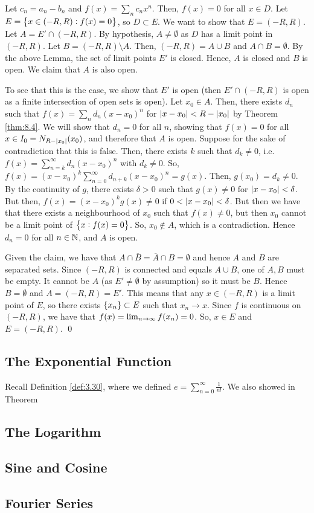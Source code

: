 \begin{nproof}
    Let $c_n = a_n - b_n$ and $f(x) = \sum_n c_nx^n$. Then, $f(x) = 0$ for all $x \in D$. Let $E = \set{x \in (-R, R): f(x) = 0}$, so $D \subset E$. We want to show that $E = (-R, R)$. Let $A = E' \cap (-R, R)$. By hypothesis, $A \neq \emptyset$ as $D$ has a limit point in $(-R, R)$. Let $B = (-R, R) \setminus A$. Then, $(-R, R) = A \cup B$ and $A \cap B = \emptyset$. By the above Lemma, the set of limit points $E'$ is closed. Hence, $A$ is closed and $B$ is open. We claim that $A$ is also open.

    To see that this is the case, we show that $E'$ is open (then $E' \cap (-R, R)$ is open as a finite intersection of open sets is open). Let $x_0 \in A$. Then, there exists $d_n$ such that $f(x) = \sum_n d_n(x - x_0)^n$ for $\abs{x - x_0} < R - \abs{x_0}$ by Theorem \ref{thm:8.4}. We will show that $d_n = 0$ for all $n$, showing that $f(x) = 0$ for all $x \in I_0 = N_{R - \abs{x_0}}(x_0)$, and therefore that $A$ is open. Suppose for the sake of contradiction that this is false. Then, there exists $k$ such that $d_k \neq 0$, i.e. $f(x) = \sum_{n=k}^\infty d_n(x - x_0)^n$ with $d_k \neq 0$. So, $f(x) = (x-x_0)^k\sum_{n=0}^\infty d_{n+k}(x - x_0)^n = g(x)$. Then, $g(x_0) = d_k \neq 0$. By the continuity of $g$, there exists $\delta > 0$ such that $g(x) \neq 0$ for $\abs{x - x_0} < \delta$. But then, $f(x) = (x - x_0)^kg(x) \neq 0$ if $0 < \abs{x - x_0} < \delta$. But then we have that there exists a neighbourhood of $x_0$ such that $f(x) \neq 0$, but then $x_0$ cannot be a limit point of $\set{x: f(x) = 0}$. So, $x_0 \notin A$, which is a contradiction. Hence $d_n = 0$ for all $n \in \mathbb{N}$, and $A$ is open. 
    
    Given the claim, we have that $A \cap \overline{B} = \overline{A} \cap B = \emptyset$ and hence $A$ and $B$ are separated sets. Since $(-R, R)$ is connected and equals $A \cup B$, one of $A, B$ must be empty. It cannot be $A$ (as $E' \neq \emptyset$ by assumption) so it must be $B$. Hence $B = \emptyset$ and $A = (-R, R) = E'$. This means that any $x \in (-R, R)$ is a limit point of $E$, so there exists $\set{x_n} \subset E$ such that $x_n \rightarrow x$. Since $f$ is continuous on $(-R, R)$, we have that $f(x) = \lim_{n \rightarrow \infty} f(x_n) = 0$. So, $x \in E$ and $E = (-R, R)$. \qed
\end{nproof}

\subsection{The Exponential Function}
Recall Definition \ref{def:3.30}, where we defined $e = \sum_{n=0}^\infty \frac{1}{n!}$. We also showed in Theorem
\subsection{The Logarithm}

\subsection{Sine and Cosine}

\subsection{Fourier Series}